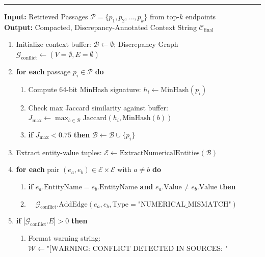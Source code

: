 \documentclass[fleqn,10pt]{article}
\begin{document}
\begin{minipage}{\textwidth}
\vspace{0.5em}
\vspace{0.4em}
\hrule
\vspace{0.4em}
\textbf{Input:} Retrieved Passages $\mathcal{P} = \{p_1, p_2, \dots, p_k\}$ from top-$k$ endpoints\\
\textbf{Output:} Compacted, Discrepancy-Annotated Context String $\mathcal{C}_{\text{final}}$
\begin{enumerate}[leftmargin=2em,noitemsep]
    \item Initialize context buffer: $\mathcal{B} \leftarrow \emptyset$; Discrepancy Graph $\mathcal{G}_{\text{conflict}} \leftarrow (V=\emptyset, E=\emptyset)$
    \item \textbf{for each} passage $p_i \in \mathcal{P}$ \textbf{do}
    \begin{enumerate}[leftmargin=1.5em,noitemsep]
        \item Compute 64-bit MinHash signature: $h_i \leftarrow \text{MinHash}(p_i)$
        \item Check max Jaccard similarity against buffer: $J_{\max} \leftarrow \max_{b \in \mathcal{B}} \text{Jaccard}(h_i, \text{MinHash}(b))$
        \item \textbf{if} $J_{\max} < 0.75$ \textbf{then} $\mathcal{B} \leftarrow \mathcal{B} \cup \{p_i\}$
    \end{enumerate}
    \item Extract entity-value tuples: $\mathcal{E} \leftarrow \text{ExtractNumericalEntities}(\mathcal{B})$
    \item \textbf{for each} pair $(e_a, e_b) \in \mathcal{E} \times \mathcal{E}$ with $a \neq b$ \textbf{do}
    \begin{enumerate}[leftmargin=1.5em,noitemsep]
        \item \textbf{if} $e_a.\text{EntityName} = e_b.\text{EntityName}$ \textbf{and} $e_a.\text{Value} \neq e_b.\text{Value}$ \textbf{then}
        \item $\quad \mathcal{G}_{\text{conflict}}.\text{AddEdge}(e_a, e_b, \text{Type}=\text{"NUMERICAL\_MISMATCH"})$
    \end{enumerate}
    \item \textbf{if} $|\mathcal{G}_{\text{conflict}}.E| > 0$ \textbf{then}
    \begin{enumerate}[leftmargin=1.5em,noitemsep]
        \item Format warning string: $\mathcal{W} \leftarrow \text{"[WARNING: CONFLICT DETECTED IN SOURCES: "}$

\end{enumerate}
\end{enumerate}
\end{minipage}
\end{document}
